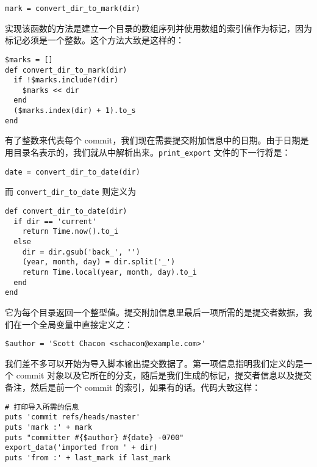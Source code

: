 \documentclass[a4paper]{book}
\begin{document}
\begin{shaded}\begin{verbatim}
mark = convert_dir_to_mark(dir)
\end{verbatim}\end{shaded}

实现该函数的方法是建立一个目录的数组序列并使用数组的索引值作为标记，因为标记必须是一个整数。这个方法大致是这样的：

\begin{shaded}\begin{verbatim}
$marks = []
def convert_dir_to_mark(dir)
  if !$marks.include?(dir)
    $marks << dir
  end
  ($marks.index(dir) + 1).to_s
end
\end{verbatim}\end{shaded}

有了整数来代表每个 commit，我们现在需要提交附加信息中的日期。由于日期是用目录名表示的，我们就从中解析出来。\texttt{print\_export} 文件的下一行将是：

\begin{shaded}\begin{verbatim}
date = convert_dir_to_date(dir)
\end{verbatim}\end{shaded}

而 \texttt{convert\_dir\_to\_date} 则定义为

\begin{shaded}\begin{verbatim}
def convert_dir_to_date(dir)
  if dir == 'current'
    return Time.now().to_i
  else
    dir = dir.gsub('back_', '')
    (year, month, day) = dir.split('_')
    return Time.local(year, month, day).to_i
  end
end
\end{verbatim}\end{shaded}

它为每个目录返回一个整型值。提交附加信息里最后一项所需的是提交者数据，我们在一个全局变量中直接定义之：

\begin{shaded}\begin{verbatim}
$author = 'Scott Chacon <schacon@example.com>'
\end{verbatim}\end{shaded}

我们差不多可以开始为导入脚本输出提交数据了。第一项信息指明我们定义的是一个 commit 对象以及它所在的分支，随后是我们生成的标记，提交者信息以及提交备注，然后是前一个 commit 的索引，如果有的话。代码大致这样：

\begin{shaded}\begin{verbatim}
# 打印导入所需的信息
puts 'commit refs/heads/master'
puts 'mark :' + mark
puts "committer #{$author} #{date} -0700"
export_data('imported from ' + dir)
puts 'from :' + last_mark if last_mark
\end{verbatim}\end{shaded}
\end{document}
